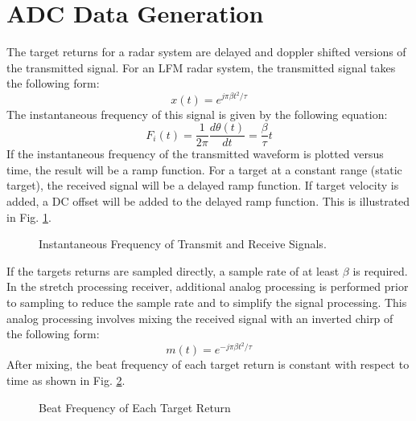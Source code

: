 \documentclass[conference]{IEEEtran}
\begin{document}
\section{ADC Data Generation}
The target returns for a radar system are delayed and doppler shifted versions of the transmitted signal. For an LFM radar system, the transmitted signal takes the following form:
\begin{equation}
x(t) = e^{j\pi\beta t^2/\tau}
\end{equation}
The instantaneous frequency of this signal is given by the following equation:
\begin{equation}
F_i(t) = \frac{1}{2\pi}\frac{d\theta(t)}{dt} = \frac{\beta}{\tau}t
\end{equation}
If the instantaneous frequency of the transmitted waveform is plotted versus time, the result will be a ramp function. For a target at a constant range (static target), the received signal will be a delayed ramp function. If target velocity is added, a DC offset will be added to the delayed ramp function. This is illustrated in Fig. \ref{instantaneous_frequency}.
\begin{figure}[H]
\centerline{}
\caption{Instantaneous Frequency of Transmit and Receive Signals.}
\label{instantaneous_frequency}
\end{figure}
If the targets returns are sampled directly, a sample rate of at least $\beta$ is required. In the stretch processing receiver, additional analog processing is performed prior to sampling to reduce the sample rate and to simplify the signal processing. This analog processing involves mixing the received signal with an inverted chirp of the following form:
\begin{equation}
m(t) = e^{-j\pi\beta t^2/\tau}
\end{equation}
After mixing, the beat frequency of each target return is constant with respect to time as shown in Fig. \ref{beat_frequency}.
\begin{figure}[H]
\centerline{}
\caption{Beat Frequency of Each Target Return}
\label{beat_frequency}
\end{figure}
\end{document}
